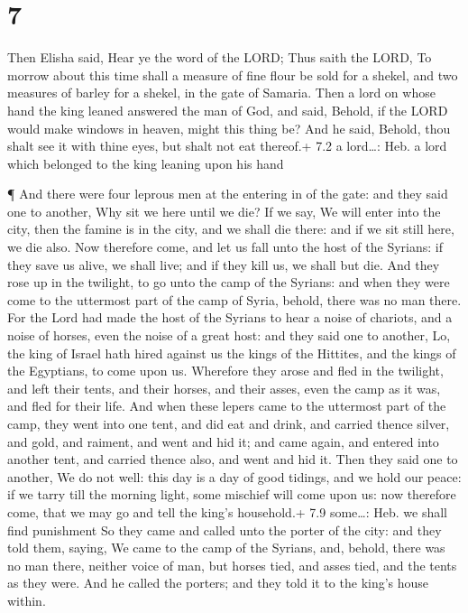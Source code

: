 \hypertarget{section-6}{%
\section{7}\label{section-6}}

 Then Elisha said, Hear ye the word of the LORD; Thus saith
the LORD, To morrow about this time shall a measure of fine flour be
sold for a shekel, and two measures of barley for a shekel, in the gate
of Samaria.  Then a lord on whose hand the king leaned
answered the man of God, and said, Behold, if the LORD would make
windows in heaven, might this thing be? And he said, Behold, thou shalt
see it with thine eyes, but shalt not eat thereof.+ 7.2 a lord\ldots:
Heb. a lord which belonged to the king leaning upon his hand

 ¶ And there were four leprous men at the entering in of the
gate: and they said one to another, Why sit we here until we die?
 If we say, We will enter into the city, then the famine is
in the city, and we shall die there: and if we sit still here, we die
also. Now therefore come, and let us fall unto the host of the Syrians:
if they save us alive, we shall live; and if they kill us, we shall but
die.  And they rose up in the twilight, to go unto the camp
of the Syrians: and when they were come to the uttermost part of the
camp of Syria, behold, there was no man there.  For the Lord
had made the host of the Syrians to hear a noise of chariots, and a
noise of horses, even the noise of a great host: and they said one to
another, Lo, the king of Israel hath hired against us the kings of the
Hittites, and the kings of the Egyptians, to come upon us. 
Wherefore they arose and fled in the twilight, and left their tents, and
their horses, and their asses, even the camp as it was, and fled for
their life.  And when these lepers came to the uttermost
part of the camp, they went into one tent, and did eat and drink, and
carried thence silver, and gold, and raiment, and went and hid it; and
came again, and entered into another tent, and carried thence also, and
went and hid it.  Then they said one to another, We do not
well: this day is a day of good tidings, and we hold our peace: if we
tarry till the morning light, some mischief will come upon us: now
therefore come, that we may go and tell the king's household.+ 7.9
some\ldots: Heb. we shall find punishment  So they came and
called unto the porter of the city: and they told them, saying, We came
to the camp of the Syrians, and, behold, there was no man there, neither
voice of man, but horses tied, and asses tied, and the tents as they
were.  And he called the porters; and they told it to the
king's house within.

